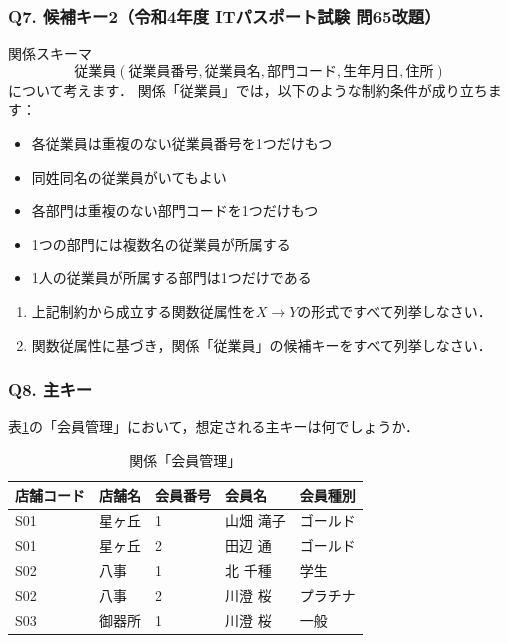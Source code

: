 \subsubsection{Q7. 候補キー2（令和4年度 ITパスポート試験 問65改題）}
関係スキーマ
\begin{equation}
\textbf{従業員}(従業員番号, 従業員名, 部門コード, 生年月日, 住所)
\end{equation}
について考えます．
関係「従業員」では，以下のような制約条件が成り立ちます：
\begin{itemize}
\item 各従業員は重複のない従業員番号を1つだけもつ
\item 同姓同名の従業員がいてもよい
\item 各部門は重複のない部門コードを1つだけもつ
\item 1つの部門には複数名の従業員が所属する
\item 1人の従業員が所属する部門は1つだけである
\end{itemize}
\begin{enumerate}
    \item 上記制約から成立する関数従属性を$X \to Y$の形式ですべて列挙しなさい．
    \item 関数従属性に基づき，関係「従業員」の候補キーをすべて列挙しなさい．
\end{enumerate}


\subsubsection{Q8. 主キー}
表\ref{tab:membership-management}の「会員管理」において，想定される主キーは何でしょうか．

\begin{table}[!htbp]
\centering
\caption{関係「会員管理」}
\begin{tabular}{@{}lllll@{}}
\toprule
\textbf{店舗コード} & \textbf{店舗名} & \textbf{会員番号} & \textbf{会員名} & \textbf{会員種別} \\ \midrule
S01            & 星ヶ丘          & 1             & 山畑 滝子        & ゴールド          \\
S01            & 星ヶ丘          & 2             & 田辺 通         & ゴールド          \\
S02            & 八事           & 1             & 北 千種         & 学生            \\
S02            & 八事           & 2             & 川澄 桜         & プラチナ          \\
S03            & 御器所          & 1             & 川澄 桜         & 一般            \\ \bottomrule
\end{tabular}
\label{tab:membership-management}
\end{table}


